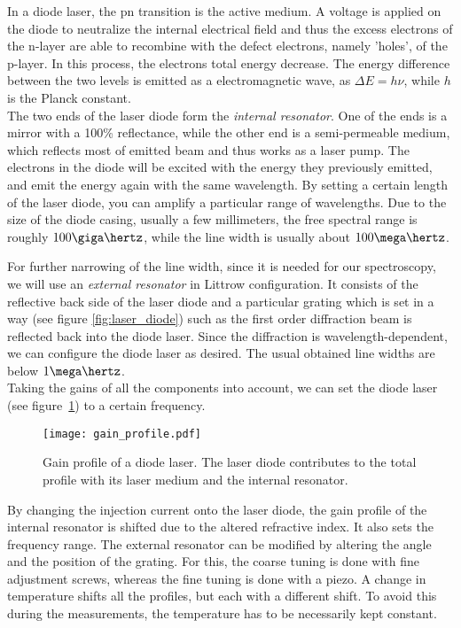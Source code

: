 In a diode laser, the pn transition is the active medium. A voltage is applied on the diode to neutralize the internal electrical field and thus the excess electrons of the n-layer are able to recombine with the defect electrons, namely 'holes', of the p-layer. In this process, the electrons total energy decrease. The energy difference between the two levels is emitted as a electromagnetic wave, as $\Delta E=h\nu$, while $h$ is the Planck constant.\\
The two ends of the laser diode form the \emph{internal resonator}. One of the ends is a mirror with a 100\% reflectance, while the other end is a semi-permeable medium, which reflects most of emitted beam and thus works as a laser pump. The electrons in the diode will be excited with the energy they previously emitted, and emit the energy again with the same wavelength. By setting a certain length of the laser diode, you can amplify a particular range of wavelengths. Due to the size of the diode casing, usually a few millimeters, the free spectral range is roughly $100\giga\hertz$, while the line width is usually about $100\mega\hertz$.

For further narrowing of the line width, since it is needed for our spectroscopy, we will use an \emph{external resonator} in Littrow configuration. It consists of the reflective back side of the laser diode and a particular grating which is set in a way (see figure \ref{fig:laser_diode}) such as the first order diffraction beam is reflected back into the diode laser. Since the diffraction is wavelength-dependent, we can configure the diode laser as desired. The usual obtained line widths are below $1\mega\hertz$.\\
Taking the gains of all the components into account, we can set the diode laser (see figure~\ref{fig:gain_profiles}) to a certain frequency.
\begin{figure}[h]
	\centering
	\texttt{[image: gain\_profile.pdf]}
	\caption[Gain profile of a diode laser]{Gain profile of a diode laser. The laser diode contributes to the total profile with its laser medium and the internal resonator. }
	\label{fig:gain_profiles}
\end{figure}

By changing the injection current onto the laser diode, the gain profile of the internal resonator is shifted due to the altered refractive index. It also sets the frequency range. The external resonator can be modified by altering the angle and the position of the grating. For this, the coarse tuning is done with fine adjustment screws, whereas the fine tuning is done with a piezo. A change in temperature shifts all the profiles, but each with a different shift. To avoid this during the measurements, the temperature has to be necessarily kept constant.

